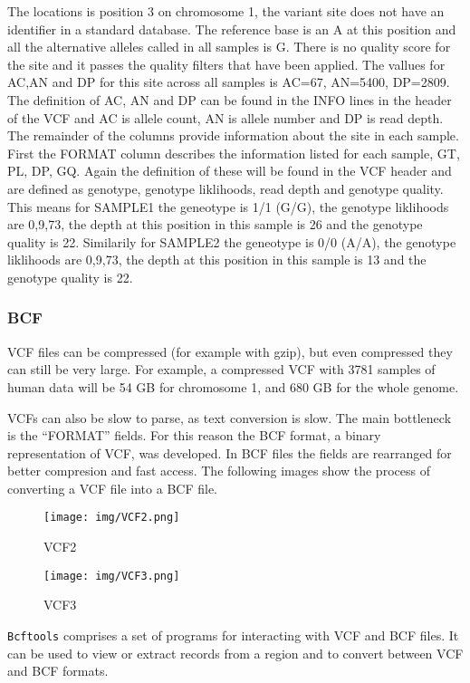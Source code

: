 \documentclass[11pt]{article}
\begin{document}
The locations is position 3 on chromosome 1, the variant site does not
have an identifier in a standard database. The reference base is an A at
this position and all the alternative alleles called in all samples is
G. There is no quality score for the site and it passes the quality
filters that have been applied. The vallues for AC,AN and DP for this
site across all samples is AC=67, AN=5400, DP=2809. The definition of
AC, AN and DP can be found in the INFO lines in the header of the VCF
and AC is allele count, AN is allele number and DP is read depth. The
remainder of the columns provide information about the site in each
sample. First the FORMAT column describes the information listed for
each sample, GT, PL, DP, GQ. Again the definition of these will be found
in the VCF header and are defined as genotype, genotype liklihoods, read
depth and genotype quality. This means for SAMPLE1 the geneotype is 1/1
(G/G), the genotype liklihoods are 0,9,73, the depth at this position in
this sample is 26 and the genotype quality is 22. Similarily for SAMPLE2
the geneotype is 0/0 (A/A), the genotype liklihoods are 0,9,73, the
depth at this position in this sample is 13 and the genotype quality is
22.

    \hypertarget{bcf}{%
\subsubsection{BCF}\label{bcf}}

VCF files can be compressed (for example with gzip), but even compressed
they can still be very large. For example, a compressed VCF with 3781
samples of human data will be 54 GB for chromosome 1, and 680 GB for the
whole genome.

VCFs can also be slow to parse, as text conversion is slow. The main
bottleneck is the ``FORMAT'' fields. For this reason the BCF format, a
binary representation of VCF, was developed. In BCF files the fields are
rearranged for better compresion and fast access. The following images
show the process of converting a VCF file into a BCF file.

    \begin{figure}
\centering
\texttt{[image: img/VCF2.png]}
\caption{VCF2}
\end{figure}

    \begin{figure}
\centering
\texttt{[image: img/VCF3.png]}
\caption{VCF3}
\end{figure}

    \texttt{Bcftools} comprises a set of programs for interacting with VCF
and BCF files. It can be used to view or extract records from a region
and to convert between VCF and BCF formats.
\end{document}
